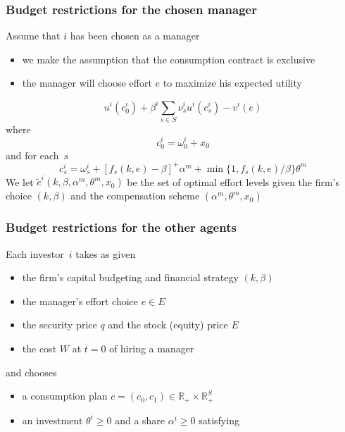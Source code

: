 \documentclass[blue]{beamer}
\def\R{\mathbb{R}}
\def\geq{\geqslant}
\theoremstyle{definition}
\theoremstyle{example}
\begin{document}

\begin{frame}\frametitle{Budget restrictions for the chosen manager}

Assume that $i$ has been chosen as a manager
\begin{itemize}
\item we make the assumption that the consumption contract is exclusive
\item the manager will choose effort $e$ to maximize his expected utility
\end{itemize}

\[
u^i(c^i_0) + \beta^i \sum_{s\in S}\nu^i_s u^i(c^i_s) - v^i(e)
\]
where
\[
c^i_0 = \omega^i_0 + x_0
\]
and for each~$s$
\[
c^i_s = \omega^i_s + [f_s(k,e)-\beta]^+ \alpha^m + \min\{1,f_s(k,e)/\beta\} \theta^m
\]
We let $\widetilde{e}^i(k,\beta,\alpha^m,\theta^m,x_0)$ be the set of optimal effort levels given the firm's choice $(k,\beta)$ and the compensation scheme $(\alpha^m,\theta^m,x_0)$

\end{frame}


\begin{frame}\frametitle{Budget restrictions for the other agents}

Each investor~$i$ takes as given
\begin{itemize}
\item the firm's capital budgeting and financial strategy $(k,\beta)$
\item the manager's effort choice $e\in E$
\item the security price $q$ and the stock (equity) price $E$
\item the cost $W$ at $t=0$ of hiring a manager
\end{itemize}
and chooses
\begin{itemize}
\item a consumption plan $c=(c_0,c_1) \in \R_+ \times \R_+^S$
\item an investment $\theta^i\geq 0$ and a share $\alpha^i \geq 0$ satisfying
\end{itemize}

\end{frame}

\end{document}

